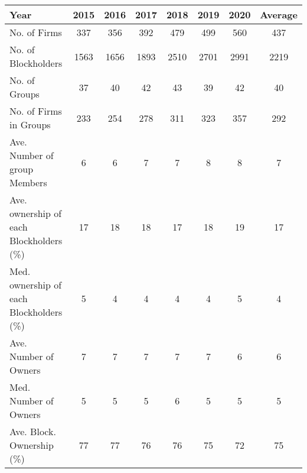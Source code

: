 \begin{tabular}{lccccccc}
\toprule
Year &  2015 &  2016 &  2017 &  2018 &  2019 &  2020 &  Average \\
\midrule
No. of Firms                            &   337 &   356 &   392 &   479 &   499 &   560 &      437 \\
No. of Blockholders                     &  1563 &  1656 &  1893 &  2510 &  2701 &  2991 &     2219 \\
No. of Groups                           &    37 &    40 &    42 &    43 &    39 &    42 &       40 \\
No. of Firms in Groups                  &   233 &   254 &   278 &   311 &   323 &   357 &      292 \\
Ave. Number of group Members            &     6 &     6 &     7 &     7 &     8 &     8 &        7 \\
Ave. ownership of each Blockholders (\%) &    17 &    18 &    18 &    17 &    18 &    19 &       17 \\
Med. ownership of each Blockholders (\%) &     5 &     4 &     4 &     4 &     4 &     5 &        4 \\
Ave. Number of Owners                   &     7 &     7 &     7 &     7 &     7 &     6 &        6 \\
Med. Number of Owners                   &     5 &     5 &     5 &     6 &     5 &     5 &        5 \\
Ave. Block. Ownership (\%)               &    77 &    77 &    76 &    76 &    75 &    72 &       75 \\
\bottomrule
\end{tabular}
